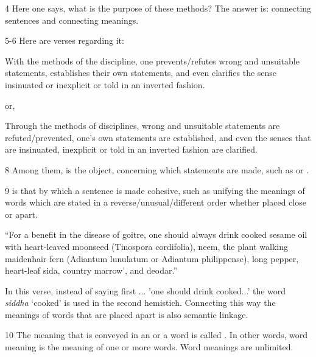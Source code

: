 \begin{translation}
    \item [4] Here one says, what is the purpose of these methods? The answer is: connecting sentences and connecting meanings.
    
    \item [5-6] Here are verses regarding it:
    
    With the methods of the discipline, one prevents/refutes wrong and unsuitable statements, establishes their own statements, and even clarifies the sense insinuated or inexplicit or told in an inverted fashion. 
     
     or,
     
    Through the methods of disciplines, wrong and unsuitable statements are refuted/prevented, one’s own statements are established, and even the senses that are insinuated, inexplicit or told in an inverted fashion are clarified. 
    
    \item [8] Among them,  is the object, concerning which statements are made, such as  or . 
    
    \item [9]  is that by which a sentence is made cohesive, such as unifying the meanings of words which are stated in a reverse/unusual/different order whether placed close or apart.
    
        ``For a benefit in the disease of goitre, one should always drink cooked sesame oil with heart-leaved moonseed (Tinospora cordifolia), neem, the plant walking maidenhair fern (Adiantum lunulatum or Adiantum philippense), long pepper, heart-leaf sida, country marrow', and deodar.'' 
    
    In this verse, instead of saying first ... 'one should drink cooked...' the word \emph{siddha} `cooked' is used in the second hemistich. Connecting this way the meanings of words that are placed apart is also semantic linkage.  
     
    
    \item [10] The meaning that is conveyed in an  or a word is called . In other words, word meaning is the meaning of one or more words. Word meanings are unlimited. 
    

\end{translation}
